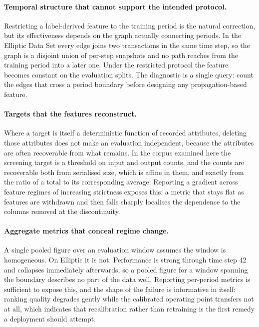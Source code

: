 \documentclass[12pt,a4paper]{article}
\begin{document}
\paragraph{Temporal structure that cannot support the intended
protocol.}
Restricting a label-derived feature to the training period is the
natural correction, but its effectiveness depends on the graph
actually connecting periods. In the Elliptic Data Set every edge
joins two transactions in the same time step, so the graph is a
disjoint union of per-step snapshots and no path reaches from the
training period into a later one. Under the restricted protocol
the feature becomes constant on the evaluation splits. The
diagnostic is a single query: count the edges that cross a
period boundary before designing any propagation-based feature.

\paragraph{Targets that the features reconstruct.}
Where a target is itself a deterministic function of recorded
attributes, deleting those attributes does not make an evaluation
independent, because the attributes are often recoverable from
what remains. In the corpus examined here the screening target is
a threshold on input and output counts, and the counts are
recoverable both from serialised size, which is affine in them,
and exactly from the ratio of a total to its corresponding
average. Reporting a gradient across feature regimes of
increasing strictness exposes this: a metric that stays flat as
features are withdrawn and then falls sharply localises the
dependence to the columns removed at the discontinuity.

\paragraph{Aggregate metrics that conceal regime change.}
A single pooled figure over an evaluation window assumes the
window is homogeneous. On Elliptic it is not. Performance is
strong through time step 42 and collapses immediately afterwards,
so a pooled figure for a window spanning the boundary describes
no part of the data well. Reporting per-period metrics is
sufficient to expose this, and the shape of the failure is
informative in itself: ranking quality degrades gently while the
calibrated operating point transfers not at all, which indicates
that recalibration rather than retraining is the first remedy a
deployment should attempt.
\end{document}
